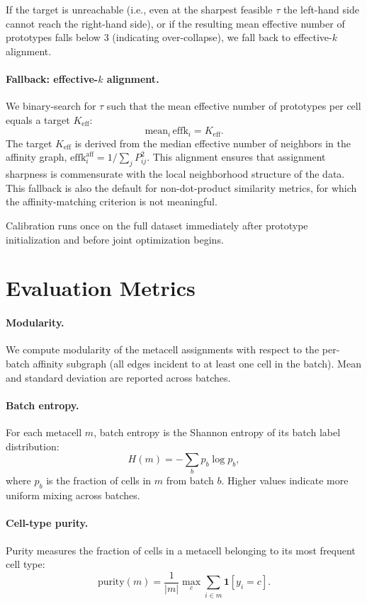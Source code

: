 If the target is unreachable (i.e., even at the sharpest feasible $\tau$ the left-hand side cannot reach the right-hand side), or if the resulting mean effective number of prototypes falls below 3 (indicating over-collapse), we fall back to effective-$k$ alignment.

\paragraph{Fallback: effective-$k$ alignment.}
We binary-search for $\tau$ such that the mean effective number of prototypes per cell equals a target $K_\mathrm{eff}$:
\[
\mathrm{mean}_i\,\mathrm{effk}_i = K_\mathrm{eff}.
\]
The target $K_\mathrm{eff}$ is derived from the median effective number of neighbors in the affinity graph, $\mathrm{effk}_i^{\mathrm{aff}} = 1/\sum_j P_{ij}^2$. This alignment ensures that assignment sharpness is commensurate with the local neighborhood structure of the data. This fallback is also the default for non-dot-product similarity metrics, for which the affinity-matching criterion is not meaningful.

Calibration runs once on the full dataset immediately after prototype initialization and before joint optimization begins.

\section{Evaluation Metrics}
\label{app:metrics}

\paragraph{Modularity.}
We compute modularity of the metacell assignments with respect to the per-batch affinity subgraph (all edges incident to at least one cell in the batch). Mean and standard deviation are reported across batches.

\paragraph{Batch entropy.}
For each metacell $m$, batch entropy is the Shannon entropy of its batch label distribution:
\[
H(m) = -\sum_b p_b \log p_b,
\]
where $p_b$ is the fraction of cells in $m$ from batch $b$. Higher values indicate more uniform mixing across batches.

\paragraph{Cell-type purity.}
Purity measures the fraction of cells in a metacell belonging to its most frequent cell type:
\[
\text{purity}(m) = \frac{1}{|m|} \max_{c} \sum_{i \in m} \mathbf{1}[y_i = c].
\]

